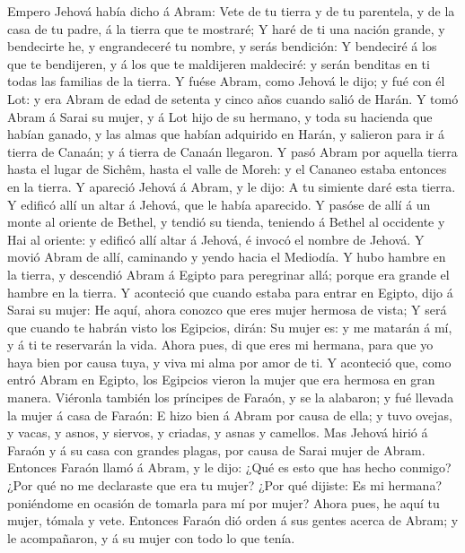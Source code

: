  Empero Jehová había dicho á Abram: Vete de tu tierra y de
tu parentela, y de la casa de tu padre, á la tierra que te mostraré;
 Y haré de ti una nación grande, y bendecirte he, y
engrandeceré tu nombre, y serás bendición:  Y bendeciré á
los que te bendijeren, y á los que te maldijeren maldeciré: y serán
benditas en ti todas las familias de la tierra.  Y fuése
Abram, como Jehová le dijo; y fué con él Lot: y era Abram de edad de
setenta y cinco años cuando salió de Harán.  Y tomó Abram
á Sarai su mujer, y á Lot hijo de su hermano, y toda su hacienda que
habían ganado, y las almas que habían adquirido en Harán, y salieron
para ir á tierra de Canaán; y á tierra de Canaán llegaron.
 Y pasó Abram por aquella tierra hasta el lugar de Sichêm,
hasta el valle de Moreh: y el Cananeo estaba entonces en la tierra.
 Y apareció Jehová á Abram, y le dijo: A tu simiente daré
esta tierra. Y edificó allí un altar á Jehová, que le había aparecido.
 Y pasóse de allí á un monte al oriente de Bethel, y
tendió su tienda, teniendo á Bethel al occidente y Hai al oriente: y
edificó allí altar á Jehová, é invocó el nombre de Jehová.
 Y movió Abram de allí, caminando y yendo hacia el
Mediodía.  Y hubo hambre en la tierra, y descendió Abram
á Egipto para peregrinar allá; porque era grande el hambre en la tierra.
 Y aconteció que cuando estaba para entrar en Egipto,
dijo á Sarai su mujer: He aquí, ahora conozco que eres mujer hermosa de
vista;  Y será que cuando te habrán visto los Egipcios,
dirán: Su mujer es: y me matarán á mí, y á ti te reservarán la vida.
 Ahora pues, di que eres mi hermana, para que yo haya
bien por causa tuya, y viva mi alma por amor de ti.  Y
aconteció que, como entró Abram en Egipto, los Egipcios vieron la mujer
que era hermosa en gran manera.  Viéronla también los
príncipes de Faraón, y se la alabaron; y fué llevada la mujer á casa de
Faraón:  E hizo bien á Abram por causa de ella; y tuvo
ovejas, y vacas, y asnos, y siervos, y criadas, y asnas y camellos.
 Mas Jehová hirió á Faraón y á su casa con grandes
plagas, por causa de Sarai mujer de Abram.  Entonces
Faraón llamó á Abram, y le dijo: ¿Qué es esto que has hecho conmigo?
¿Por qué no me declaraste que era tu mujer?  ¿Por qué
dijiste: Es mi hermana? poniéndome en ocasión de tomarla para mí por
mujer? Ahora pues, he aquí tu mujer, tómala y vete. 
Entonces Faraón dió orden á sus gentes acerca de Abram; y le
acompañaron, y á su mujer con todo lo que tenía.

